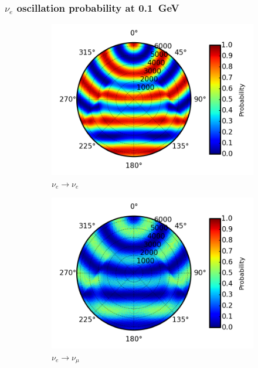 \documentclass{beamer}
\begin{document}
\begin{frame}
	\frametitle{$\nu_{e}$ oscillation probability at \SI{0.1}{GeV}}
	\begin{figure}
		\centering
		\begin{subfigure}[b]{0.33\linewidth}
			\caption{ $\nu_{e} \rightarrow \nu_{e}$ }
			\includegraphics[width=\linewidth]{earth_0.1gev_nue2nue_throughEarth.png}
		\end{subfigure}
		\begin{subfigure}[b]{0.33\linewidth}
			\caption{ $\nu_{e} \rightarrow \nu_{\mu}$ }
			\includegraphics[width=\linewidth]{earth_0.1gev_nue2numu_throughEarth.png}
		\end{subfigure}
		\begin{subfigure}[b]{0.33\linewidth}

\end{subfigure}
\end{figure}
\end{frame}
\end{document}
